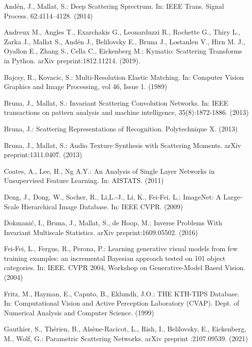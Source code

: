 \documentclass[runningheads]{llncs}
\begin{document}
\begin{thebibliography}{8}

Andén, J., Mallat, S.: Deep Scattering Sprectrum. In: IEEE Trans. Signal Process.  62:4114–4128. (2014)

Andreux M., Angles T., Exarchakis G., Leonarduzzi R., Rochette G., Thiry L., Zarka J., Mallat S., Andén J., Belilovsky E., Bruna J., Lostanlen V., Hirn M. J., Oyallon E., Zhang S., Cella C., Eickenberg M.:  Kymatio: Scattering Transforms in Python. arXiv preprint:1812.11214. (2019).

Bajcsy, R., Kovacic, S.: Multi-Resolution Elastic Matching. In: Computer Vision Graphics and Image Processing, vol 46, Issue 1. (1989)

Bruna, J., Mallat, S.: Invariant Scattering Convolution Networks. In: IEEE transactions on pattern analysis and machine intelligence, 35(8):1872-1886. (2013)

Bruna, J.: Scattering Representations of Recognition. Polytechnique X. (2013)

Bruna, J., Mallat, S.: Audio Texture Synthesis with Scattering Moments. arXiv preprint:1311.0407. (2013)

Coates, A., Lee, H., Ng A.Y.: An Analysis of Single Layer Networks in Unsupervised Feature Learning. In: AISTATS. (2011)

Deng, J., Dong, W., Socher, R., Li,L.-J., Li, K., Fei-Fei, L.: ImageNet: A Large-Scale Hierarchical Image Database. In: IEEE CVPR. (2009)

Dokmanić, I., Bruna, J., Mallat, S., de Hoop, M.: Inverse Problems With Invariant Multiscale Statistics. arXiv preprint:1609.05502. (2016)

Fei-Fei, L., Fergus, R., Perona, P.: Learning generative visual models from few training examples: an incremental Bayesian approach tested on 101 object categories. In: IEEE. CVPR 2004, Workshop on Generative-Model Based Vision. (2004)

Fritz, M., Hayman, E., Caputo, B., Eklundh, J.O.: THE KTH-TIPS Database. In: Computational Vision and Active Perception Laboratory (CVAP). Dept. of Numerical Analysis and Computer Science. (1999)

Gauthier, S., Thérien, B., Alsène-Racicot, L., Rish, I., Belilovsky, E., Eickenberg, M., Wolf, G.: Parametric Scattering Networks. arXiv preprint :2107.09539. (2021)


\end{thebibliography}
\end{document}
